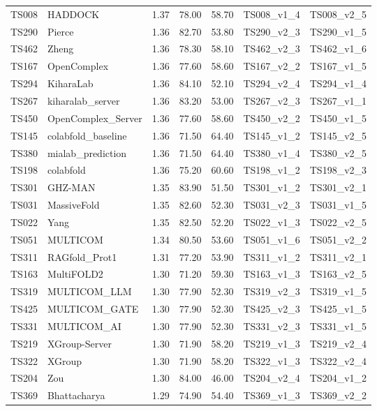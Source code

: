\begin{longtable}{lllllll}
TS008 & HADDOCK & 1.37 & 78.00 & 58.70 & TS008\_v1\_4 & TS008\_v2\_5 \\ 
TS290 & Pierce & 1.36 & 82.70 & 53.80 & TS290\_v2\_3 & TS290\_v1\_5 \\ 
TS462 & Zheng & 1.36 & 78.30 & 58.10 & TS462\_v2\_3 & TS462\_v1\_6 \\ 
TS167 & OpenComplex & 1.36 & 77.60 & 58.60 & TS167\_v2\_2 & TS167\_v1\_5 \\ 
TS294 & KiharaLab & 1.36 & 84.10 & 52.10 & TS294\_v2\_4 & TS294\_v1\_4 \\ 
TS267 & kiharalab\_server & 1.36 & 83.20 & 53.00 & TS267\_v2\_3 & TS267\_v1\_1 \\ 
TS450 & OpenComplex\_Server & 1.36 & 77.60 & 58.60 & TS450\_v2\_2 & TS450\_v1\_5 \\ 
TS145 & colabfold\_baseline & 1.36 & 71.50 & 64.40 & TS145\_v1\_2 & TS145\_v2\_5 \\ 
TS380 & mialab\_prediction & 1.36 & 71.50 & 64.40 & TS380\_v1\_4 & TS380\_v2\_5 \\ 
TS198 & colabfold & 1.36 & 75.20 & 60.60 & TS198\_v1\_2 & TS198\_v2\_3 \\ 
TS301 & GHZ-MAN & 1.35 & 83.90 & 51.50 & TS301\_v1\_2 & TS301\_v2\_1 \\ 
TS031 & MassiveFold & 1.35 & 82.60 & 52.30 & TS031\_v2\_3 & TS031\_v1\_5 \\ 
TS022 & Yang & 1.35 & 82.50 & 52.20 & TS022\_v1\_3 & TS022\_v2\_5 \\ 
TS051 & MULTICOM & 1.34 & 80.50 & 53.60 & TS051\_v1\_6 & TS051\_v2\_2 \\ 
TS311 & RAGfold\_Prot1 & 1.31 & 77.20 & 53.90 & TS311\_v1\_2 & TS311\_v2\_1 \\ 
TS163 & MultiFOLD2 & 1.30 & 71.20 & 59.30 & TS163\_v1\_3 & TS163\_v2\_5 \\ 
TS319 & MULTICOM\_LLM & 1.30 & 77.90 & 52.30 & TS319\_v2\_3 & TS319\_v1\_5 \\ 
TS425 & MULTICOM\_GATE & 1.30 & 77.90 & 52.30 & TS425\_v2\_3 & TS425\_v1\_5 \\ 
TS331 & MULTICOM\_AI & 1.30 & 77.90 & 52.30 & TS331\_v2\_3 & TS331\_v1\_5 \\ 
TS219 & XGroup-Server & 1.30 & 71.90 & 58.20 & TS219\_v1\_3 & TS219\_v2\_4 \\ 
TS322 & XGroup & 1.30 & 71.90 & 58.20 & TS322\_v1\_3 & TS322\_v2\_4 \\ 
TS204 & Zou & 1.30 & 84.00 & 46.00 & TS204\_v2\_4 & TS204\_v1\_2 \\ 
TS369 & Bhattacharya & 1.29 & 74.90 & 54.40 & TS369\_v1\_3 & TS369\_v2\_2 \\ 

\end{longtable}
